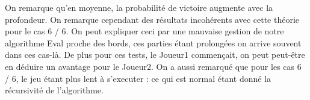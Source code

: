 \documentclass[a4paper, 10pt, french]{article}
\begin{document}
{{        On remarque qu'en moyenne, la probabilité de victoire augmente avec la profondeur. On remarque cependant des résultats
        incohérents avec cette théorie pour le cas 6 / 6. On peut expliquer ceci par une mauvaise gestion de notre algorithme
        Eval proche des bords, ces parties étant prolongées on arrive souvent dans ces cas-là. De plus pour ces tests, le Joueur1
        commençait, on peut peut-être en déduire un avantage pour le Joueur2.
        On a aussi remarqué que pour les cas 6 / 6, le jeu étant plus lent à s'executer : ce qui est normal étant donné la
        récursivité de l'algorithme.
    }
}
\end{document}
